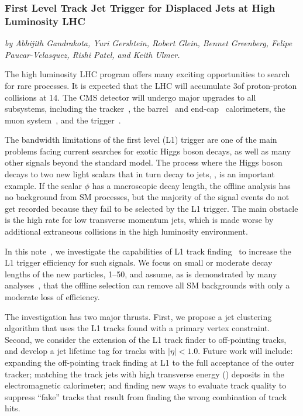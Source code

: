 \subsubsection{First Level Track Jet Trigger for Displaced Jets at High Luminosity LHC}\label{Sec:9.1.1}
\begin{center}
 {\it{ by Abhijith Gandrakota, Yuri Gershtein, Robert Glein, Bennet Greenberg, Felipe Paucar-Velasquez, Rishi Patel, and Keith Ulmer.
}}
\end{center}

The high luminosity LHC program offers many exciting opportunities to search for rare processes. It is expected that the
LHC will accumulate 3\abinv of proton-proton collisions at 14\UTeV.
The CMS detector will undergo major upgrades to all subsystems, including the tracker~\cite{cmstdr-014},
the barrel~\cite{cmstdr-barrel} and end-cap~\cite{cmstdr-ec} calorimeters, the muon system~\cite{cmstdr-mu},
and the trigger~\cite{cmstdr-017}. 

The bandwidth limitations of the first level (L1) trigger
are one of the main problems facing current searches 
for exotic Higgs boson decays, as well as many other signals beyond the standard model.
The process where the Higgs boson decays to two new light scalars that in turn decay to jets, \Hphiphi, is an important example. If the scalar $\phi$ has a
macroscopic decay length, the offline analysis has no background from SM processes, but the majority of the signal events do not get recorded because they fail to be selected by the L1 trigger.
The main obstacle is the high rate for low transverse momentum jets, which is made worse by additional extraneous \pp collisions in the
high luminosity environment.

In this note~\cite{CMS-PAS-FTR-18-018}, 
we investigate the capabilities of L1 track finding~\cite{cmstdr-014} to increase the L1 trigger efficiency for such signals.
We focus on small or moderate decay lengths of the new particles, 1--50\Umm, and assume, as is demonstrated by
many analyses~\cite{ll1, ll2, ll3}, that the offline selection can remove all SM backgrounds with only a moderate loss of efficiency.

The investigation has two major thrusts. First, we propose a jet clustering algorithm that uses the L1 tracks found with a primary vertex constraint.
Second, we consider the extension of the L1
track finder to off-pointing tracks, and develop a jet lifetime tag for tracks with $|\eta| < 1.0$. 
Future work will include: expanding the off-pointing track finding at L1 to the full acceptance of the outer tracker;
matching the track jets with high transverse energy (\ET) deposits in the electromagnetic calorimeter; and finding new ways to evaluate
track quality to suppress ``fake'' tracks that result from finding the wrong combination of track hits. 

